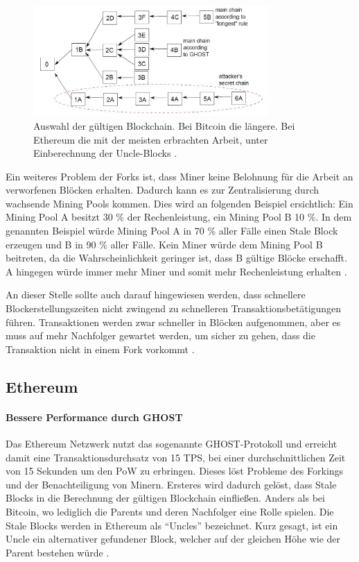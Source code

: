 \begin{figure}[!htbp]
  \centering
    \includegraphics[width=0.8\textwidth,angle=0]{images/forking-risks}
     \caption{Auswahl der gültigen Blockchain. Bei Bitcoin die längere. Bei Ethereum die mit der meisten erbrachten Arbeit, unter Einberechnung der Uncle-Blocks \cite{SompolinskyAcceleratingBitcoinTransaction2013}.}
    \label{fig:forking-risks}
\end{figure} 

Ein weiteres Problem der Forks ist, dass Miner keine Belohnung für die Arbeit an verworfenen Blöcken erhalten. Dadurch kann es zur Zentralisierung durch wachsende Mining Pools kommen. Dies wird an folgenden Beispiel ersichtlich: Ein Mining Pool A besitzt 30 \% der Rechenleistung, ein Mining Pool B 10 \%. In dem genannten Beispiel würde Mining Pool A in 70 \% aller Fälle einen Stale Block erzeugen und B in 90 \% aller Fälle. Kein Miner würde dem Mining Pool B beitreten, da die Wahrscheinlichkeit geringer ist, dass B gültige Blöcke erschafft. A hingegen würde immer mehr Miner und somit mehr Rechenleistung erhalten \cite{EthereumTeamEthereumWhitePaper2017}.

An dieser Stelle sollte auch darauf hingewiesen werden, dass schnellere Blockerstellungszeiten nicht zwingend zu schnelleren Transaktionsbetätigungen führen. Transaktionen werden zwar schneller in Blöcken aufgenommen, aber es muss auf mehr Nachfolger gewartet werden, um sicher zu gehen, dass die Transaktion nicht in einem Fork vorkommt \cite{SchererPerformanceScalabilityBlockchain2017}.

\subsection{Ethereum}

\paragraph{Bessere Performance durch GHOST}
Das Ethereum Netzwerk nutzt das sogenannte GHOST-Protokoll und erreicht damit eine Transaktionsdurchsatz von 15 \acs{TPS}, bei einer durchschnittlichen Zeit von 15 Sekunden um den \acs{PoW} zu erbringen. Dieses löst Probleme des Forkings und der Benachteiligung von Minern. Ersteres wird dadurch gelöst, dass Stale Blocks in die Berechnung der gültigen Blockchain einfließen. Anders als bei Bitcoin, wo lediglich die Parents und deren Nachfolger eine Rolle spielen. Die Stale Blocks werden in Ethereum als ``Uncles'' bezeichnet. Kurz gesagt, ist ein Uncle ein alternativer gefundener Block, welcher auf der gleichen Höhe wie der Parent bestehen würde \cite{EthereumTeamEthereumWhitePaper2017}.

